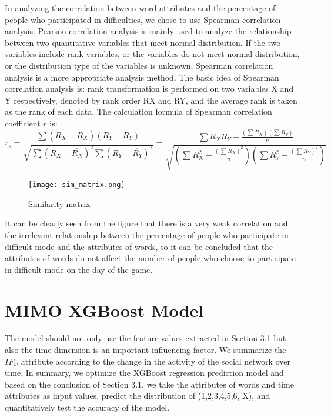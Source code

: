 \documentclass[12pt]{article}  %
\begin{document}
In analyzing the correlation between word attributes and the percentage of people who participated in difficulties, we chose to use Spearman correlation analysis. Pearson correlation analysis is mainly used to analyze the relationship between two quantitative variables that meet normal distribution. If the two variables include rank variables, or the variables do not meet normal distribution, or the distribution type of the variables is unknown, Spearman correlation analysis is a more appropriate analysis method. The basic idea of Spearman correlation analysis is: rank transformation is performed on two variables X and Y respectively, denoted by rank order RX and RY, and the average rank is taken as the rank of each data. The calculation formula of Spearman correlation coefficient $r$ is:
\begin{equation}\label{eq:spearman}
    r_{s}=\frac{\sum\left(R_{X}-\overline{R_{X}}\right)\left(R_{Y}-R_{Y}\right)}{\sqrt{\sum\left(R_{X}-\overline{R_{X}}\right)^{2} \sum\left(R_{Y}-\overline{R_{Y}}\right)^{2}}}=\frac{\sum R_{X} R_{Y}-\frac{\left(\sum R_{X}\right)\left(\sum R_{Y}\right)}{n}}{\sqrt{\left(\sum R_{X}^{2}-\frac{\left(\sum R_{X}\right)^{2}}{n}\right)\left(\sum R_{Y}^{2}-\frac{\left(\sum R_{Y}\right)^{2}}{n}\right)}}
\end{equation}

\begin{figure}[htbp]
    \centering
    \texttt{[image: sim\_matrix.png]}
    \caption{Similarity matrix}\label{fig:sim_matrix}
\end{figure}

It can be clearly seen from the figure that there is a very weak correlation and the irrelevant relationship between the percentage of people who participate in difficult mode and the attributes of words, so it can be concluded that the attributes of words do not affect the number of people who choose to participate in difficult mode on the day of the game.




\section{MIMO XGBoost Model}
The model should not only use the feature values extracted in Section 3.1 but also the time dimension is an important influencing factor. We summarize the $IF_w$ attribute according to the change in the activity of the social network over time. In summary, we optimize the XGBoost regression prediction model and based on the conclusion of Section 3.1, we take the attributes of words and time attributes as input values, predict the distribution of (1,2,3,4,5,6, X), and quantitatively test the accuracy of the model.
\end{document}
